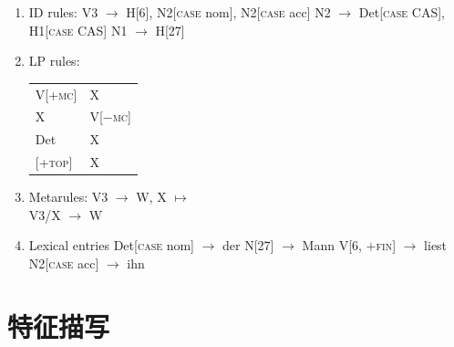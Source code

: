 \begin{enumerate}
\item ID rules:
\eal
\ex V3 $\to$ H[6], N2[\textsc{case} nom], N2[\textsc{case} acc] 
\ex N2 $\to$ Det[\textsc{case} CAS], H1[\textsc{case} CAS]
\ex N1 $\to$ H[27]
\zl
\item LP rules:
\ea
\begin{tabular}[t]{@{}l@{~$<$~}l@{}}
V[+\textsc{mc}]  & X\\
X       & V[$-$\textsc{mc}]\\
Det     & X\\
{}[+\textsc{top}] & X\\
\end{tabular}
\z
\item Metarules:
\ea
V3  $\to$ W, X $\mapsto$\\
V3/X  $\to$ W
\z


\item Lexical entries
\eal
\ex Det[\textsc{case} nom] $\to$ der
\ex N[27] $\to$ Mann
\ex V[6, $+$\textsc{fin}] $\to$ liest
\ex N2[\textsc{case} acc] $\to$ ihn
\zl

\end{enumerate}

\section{特征描写}

